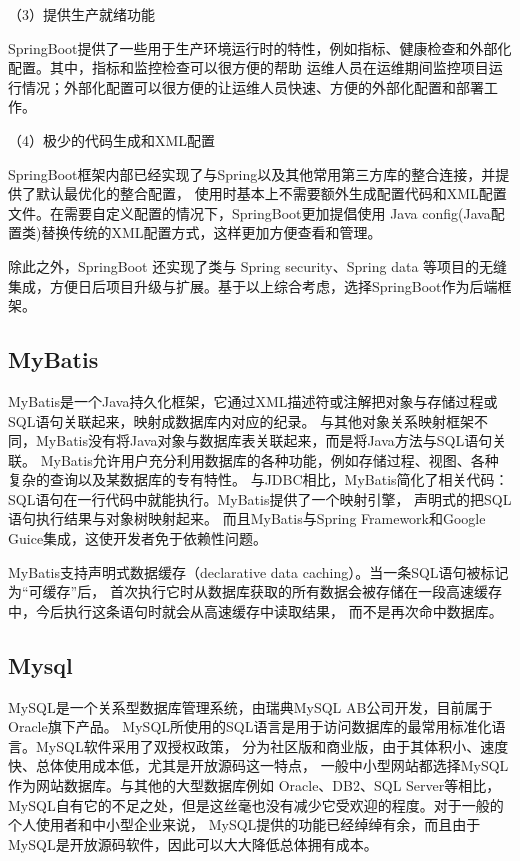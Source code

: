 （3）提供生产就绪功能

SpringBoot提供了一些用于生产环境运行时的特性，例如指标、健康检查和外部化配置。其中，指标和监控检查可以很方便的帮助
运维人员在运维期间监控项目运行情况；外部化配置可以很方便的让运维人员快速、方便的外部化配置和部署工作。

（4）极少的代码生成和XML配置

SpringBoot框架内部已经实现了与Spring以及其他常用第三方库的整合连接，并提供了默认最优化的整合配置，
使用时基本上不需要额外生成配置代码和XML配置文件。在需要自定义配置的情况下，SpringBoot更加提倡使用
Java config(Java配置类)替换传统的XML配置方式，这样更加方便查看和管理。

除此之外，SpringBoot 还实现了类与 Spring security、Spring data 等项目的无缝
集成，方便日后项目升级与扩展。基于以上综合考虑，选择SpringBoot作为后端框架。

\subsection{MyBatis}

MyBatis是一个Java持久化框架，它通过XML描述符或注解把对象与存储过程或SQL语句关联起来，映射成数据库内对应的纪录。
与其他对象关系映射框架不同，MyBatis没有将Java对象与数据库表关联起来，而是将Java方法与SQL语句关联。
MyBatis允许用户充分利用数据库的各种功能，例如存储过程、视图、各种复杂的查询以及某数据库的专有特性。
与JDBC相比，MyBatis简化了相关代码：SQL语句在一行代码中就能执行。MyBatis提供了一个映射引擎，
声明式的把SQL语句执行结果与对象树映射起来。
而且MyBatis与Spring Framework和Google Guice集成，这使开发者免于依赖性问题。

MyBatis支持声明式数据缓存（declarative data caching）。当一条SQL语句被标记为“可缓存”后，
首次执行它时从数据库获取的所有数据会被存储在一段高速缓存中，今后执行这条语句时就会从高速缓存中读取结果，
而不是再次命中数据库。

\subsection{Mysql}

MySQL是一个关系型数据库管理系统，由瑞典MySQL AB公司开发，目前属于Oracle旗下产品。
MySQL所使用的SQL语言是用于访问数据库的最常用标准化语言。MySQL软件采用了双授权政策，
分为社区版和商业版，由于其体积小、速度快、总体使用成本低，尤其是开放源码这一特点，
一般中小型网站都选择MySQL作为网站数据库。与其他的大型数据库例如 Oracle、DB2、SQL Server等相比，
MySQL自有它的不足之处，但是这丝毫也没有减少它受欢迎的程度。对于一般的个人使用者和中小型企业来说，
MySQL提供的功能已经绰绰有余，而且由于 MySQL是开放源码软件，因此可以大大降低总体拥有成本。

